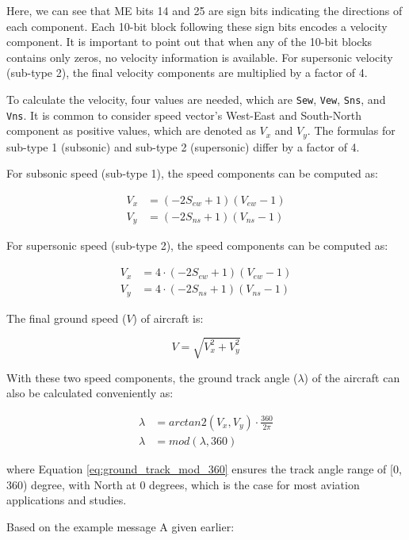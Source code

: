 Here, we can see that ME bits 14 and 25 are sign bits indicating the directions of each component. Each 10-bit block following these sign bits encodes a velocity component. It is important to point out that when any of the 10-bit blocks contains only zeros, no velocity information is available. For supersonic velocity (sub-type 2), the final velocity components are multiplied by a factor of 4.

To calculate the velocity, four values are needed, which are \texttt{Sew}, \texttt{Vew},  \texttt{Sns}, and \texttt{Vns}. It is common to consider speed vector's West-East and South-North component as positive values, which are denoted as $V_x$ and $V_y$. The formulas for sub-type 1 (subsonic) and sub-type 2 (supersonic) differ by a factor of 4.

For subsonic speed (sub-type 1), the speed components can be computed as:

\begin{align}
  V_x &= (-2S_{ew} + 1) (V_{ew} - 1) \\
  V_y &= (-2S_{ns} + 1) (V_{ns} - 1)
\end{align}

For supersonic speed (sub-type 2), the speed components can be computed as:

\begin{align}
  V_x &= 4 \cdot (-2S_{ew} + 1) (V_{ew} - 1)\\
  V_y &= 4 \cdot (-2S_{ns} + 1) (V_{ns} - 1)
\end{align}


The final ground speed ($V$) of aircraft is:

\begin{equation}
  V = \sqrt{V_x^2 + V_y^2}
\end{equation}

With these two speed components, the ground track angle ($\lambda$) of the aircraft can also be calculated conveniently as:

\begin{align}
  \lambda &= arctan2 \left( V_x, V_y \right) \cdot \frac{360}{2\pi} \\
  \lambda &= mod(\lambda, 360) \label{eq:ground_track_mod_360}
\end{align}

where Equation \ref{eq:ground_track_mod_360} ensures the track angle range of [0, 360) degree, with North at 0 degrees, which is the case for most aviation applications and studies.

Based on the example message A given earlier:

